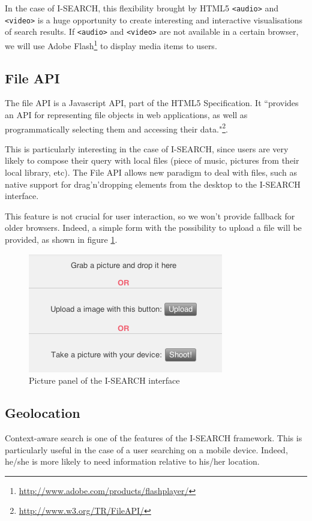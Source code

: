 \documentclass[runningheads,a4paper]{llncs} \usepackage[utf8]{inputenc}
\begin{document}
In the case of I-SEARCH, this flexibility brought by HTML5 {\tt <audio>} and {\tt <video>} is a huge opportunity to create interesting and interactive visualisations of search results.
If  {\tt <audio>} and {\tt <video>} are not available in a certain browser, we will use Adobe Flash\footnote{\url{http://www.adobe.com/products/flashplayer/}} to display media items to users.

\subsection{File API}

The file API is a Javascript API, part of the HTML5 Specification. It ``provides an API for representing file objects in web applications, as well as programmatically selecting them and accessing their data."\footnote{\url{http://www.w3.org/TR/FileAPI/}}. 

This is particularly interesting in the case of I-SEARCH, since users are very likely to compose their query with local files (piece of music, pictures from their local library, etc). The File API allows new paradigm to deal with files, such as native support for drag'n'dropping elements from the desktop to the I-SEARCH interface.

This feature is not crucial for user interaction, so we won't provide fallback for older browsers. Indeed, a simple form with the possibility to upload a file will be provided, as shown in figure \ref{fig:input-picture}.
 
\begin{figure}[h!]
  \centering
    \includegraphics[width=0.3\linewidth]{resources/input-picture.png}
  \caption{Picture panel of the I-SEARCH interface}
  \label{fig:input-picture}
\end{figure}

\subsection{Geolocation}
Context-aware search is one of the features of the I-SEARCH framework. This is particularly useful in the case of a user searching on a mobile device. Indeed, he/she is more likely to need information relative to his/her location.
\end{document}
